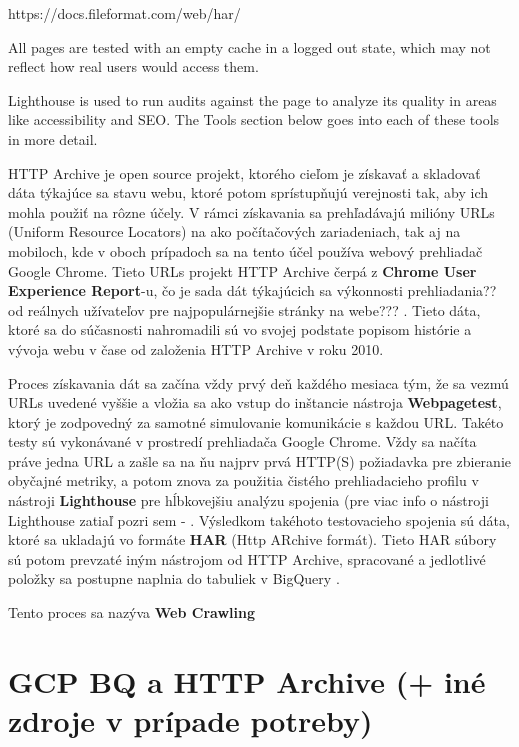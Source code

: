 https://docs.fileformat.com/web/har/


All pages are tested with an empty cache in a logged out state, which may not reflect how real users would access them.

Lighthouse is used to run audits against the page to analyze its quality in areas like accessibility and SEO. The Tools section below goes into each of these tools in more detail.

HTTP Archive je open source projekt, ktorého cieľom je získavať a skladovať dáta 
týkajúce sa stavu webu, ktoré potom sprístupňujú verejnosti tak, aby ich mohla
použiť na rôzne účely. V rámci získavania sa prehľadávajú milióny URLs (Uniform 
Resource Locators) na ako počítačových zariadeniach, tak aj na mobiloch, kde v oboch prípadoch sa na tento účel používa webový prehliadač Google Chrome. 
 Tieto URLs projekt HTTP Archive čerpá z 
\textbf{Chrome User Experience Report}-u, čo je sada dát týkajúcich sa výkonnosti
prehliadania?? od reálnych užívateľov pre najpopulárnejšie stránky na webe???
. Tieto dáta, ktoré sa do súčasnosti nahromadili sú vo svojej podstate popisom histórie a vývoja webu v čase od založenia HTTP Archive v roku 2010.

Proces získavania dát sa začína vždy prvý deň každého mesiaca tým, že sa vezmú URLs uvedené vyššie a vložia sa ako vstup do inštancie nástroja 
\textbf{Webpagetest}, ktorý je zodpovedný za samotné simulovanie komunikácie s 
každou URL. Takéto testy sú vykonávané v prostredí prehliadača Google Chrome.
Vždy sa načíta práve jedna URL a zašle sa na ňu najprv prvá HTTP(S) požiadavka pre zbieranie obyčajné metriky, a potom znova za použitia čistého prehliadacieho profilu v nástroji \textbf{Lighthouse} pre hĺbkovejšiu analýzu spojenia (pre viac info o nástroji Lighthouse zatiaľ pozri sem - . Výsledkom takéhoto testovacieho spojenia sú dáta, ktoré sa ukladajú vo formáte \textbf{HAR} (Http ARchive formát). Tieto HAR súbory sú potom prevzaté iným nástrojom od HTTP Archive, spracované a jedlotlivé položky sa postupne naplnia do tabuliek v BigQuery .

Tento proces sa nazýva \textbf{Web Crawling}

\section{GCP BQ a HTTP Archive (+ iné zdroje v prípade potreby)}

